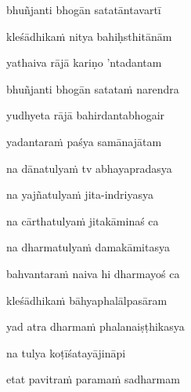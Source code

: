 \nemslokac 
bhuñjanti bhogān satatāntavartī
\dontdisplaylinenum

\nemslokad 
kleśādhika\.m nitya bahiḥsthitānām \veg\dontdisplaylinenum

\ujvers\nemsloka 
yathaiva rājā kariṇo 'ntadantam
\dontdisplaylinenum

\nemslokab 
bhuñjanti bhogān satata\.m narendra \danda\dontdisplaylinenum

\nemslokac 
yudhyeta rājā bahirdantabhogair
\dontdisplaylinenum

\nemslokad 
yadantara\.m paśya samānajātam \veg\dontdisplaylinenum

\ujvers\nemsloka 
na dānatulya\.m tv abhayapradasya
\dontdisplaylinenum

\nemslokab 
na yajñatulya\.m jita-indriyasya \danda\dontdisplaylinenum

\nemslokac 
na cārthatulya\.m jitakāminaś ca
\dontdisplaylinenum

\nemslokad 
na dharmatulya\.m damakāmitasya \veg\dontdisplaylinenum

\ujvers\nemsloka 
bahvantara\.m naiva hi dharmayoś ca
\dontdisplaylinenum

\nemslokab 
kleśādhika\.m bāhyaphalālpasāram \danda\dontdisplaylinenum

\nemslokac 
yad atra dharma\.m phalanaiṣṭhikasya
\dontdisplaylinenum

\nemslokad 
na tulya koṭīśatayājināpi \veg\dontdisplaylinenum

\ujvers\nemsloka 
etat pavitra\.m parama\.m sadharmam
\dontdisplaylinenum

